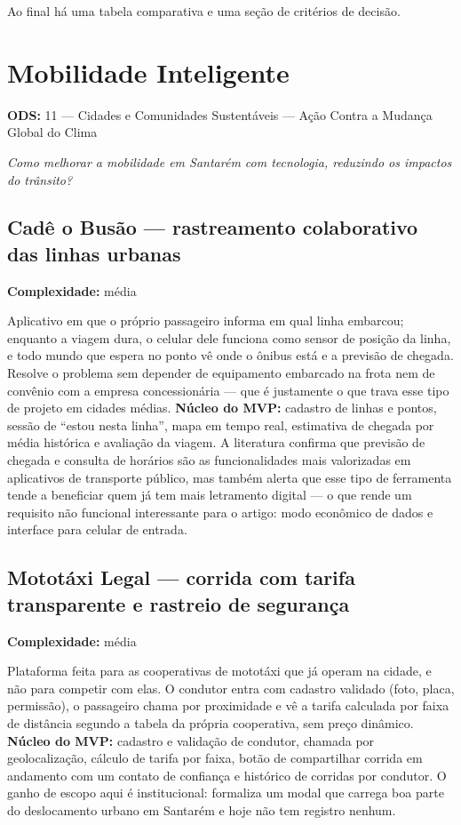 \documentclass[11pt,a4paper]{article}
\newcommand{\complex}[1]{{\small\color{cinza}\textbf{Complexidade:} #1}}
\newcommand{\ods}[1]{{\small\color{verde}\textbf{ODS:} #1}}
\begin{document}
Ao final há uma tabela comparativa e uma seção de critérios de decisão.

\newpage

\section{Mobilidade Inteligente}
\ods{11 --- Cidades e Comunidades Sustentáveis  --- Ação Contra a Mudança Global do Clima}

\emph{Como melhorar a mobilidade em Santarém com tecnologia, reduzindo os impactos do trânsito?}

\subsection{Cadê o Busão --- rastreamento colaborativo das linhas urbanas}
\complex{média}

Aplicativo em que o próprio passageiro informa em qual linha embarcou; enquanto a viagem dura, o
celular dele funciona como sensor de posição da linha, e todo mundo que espera no ponto vê onde o
ônibus está e a previsão de chegada. Resolve o problema sem depender de equipamento embarcado na
frota nem de convênio com a empresa concessionária --- que é justamente o que trava esse tipo de
projeto em cidades médias. \textbf{Núcleo do MVP:} cadastro de linhas e pontos, sessão de
``estou nesta linha'', mapa em tempo real, estimativa de chegada por média histórica e avaliação
da viagem. A literatura confirma que previsão de chegada e consulta de horários são as
funcionalidades mais valorizadas em aplicativos de transporte público, mas também alerta que esse
tipo de ferramenta tende a beneficiar quem já tem mais letramento digital --- o que rende um
requisito não funcional interessante para o artigo: modo econômico de dados e interface para
celular de entrada.

\subsection{Mototáxi Legal --- corrida com tarifa transparente e rastreio de segurança}
\complex{média}

Plataforma feita para as cooperativas de mototáxi que já operam na cidade, e não para competir com
elas. O condutor entra com cadastro validado (foto, placa, permissão), o passageiro chama por
proximidade e vê a tarifa calculada por faixa de distância segundo a tabela da própria cooperativa,
sem preço dinâmico. \textbf{Núcleo do MVP:} cadastro e validação de condutor, chamada por
geolocalização, cálculo de tarifa por faixa, botão de compartilhar corrida em andamento com um
contato de confiança e histórico de corridas por condutor. O ganho de escopo aqui é institucional:
formaliza um modal que carrega boa parte do deslocamento urbano em Santarém e hoje não tem registro
nenhum.
\end{document}
